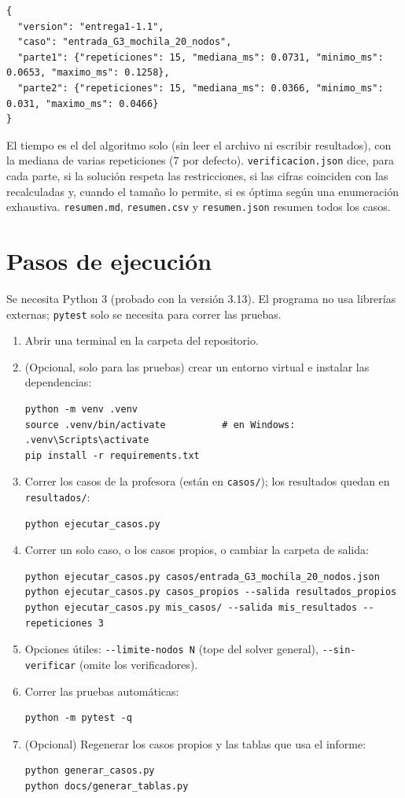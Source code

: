 \documentclass[11pt,a4paper]{article}
\begin{document}
\begin{Verbatim}
{
  "version": "entrega1-1.1",
  "caso": "entrada_G3_mochila_20_nodos",
  "parte1": {"repeticiones": 15, "mediana_ms": 0.0731, "minimo_ms": 0.0653, "maximo_ms": 0.1258},
  "parte2": {"repeticiones": 15, "mediana_ms": 0.0366, "minimo_ms": 0.031, "maximo_ms": 0.0466}
}
\end{Verbatim}

El tiempo es el del algoritmo solo (sin leer el archivo ni escribir resultados), con la mediana de varias repeticiones (7 por defecto). \texttt{verificacion.json} dice, para cada parte, si la solución respeta las restricciones, si las cifras coinciden con las recalculadas y, cuando el tamaño lo permite, si es óptima según una enumeración exhaustiva. \texttt{resumen.md}, \texttt{resumen.csv} y \texttt{resumen.json} resumen todos los casos.

\section{Pasos de ejecución}

Se necesita Python 3 (probado con la versión 3.13). El programa no usa librerías externas; \texttt{pytest} solo se necesita para correr las pruebas.

\begin{enumerate}[nosep]
  \item Abrir una terminal en la carpeta del repositorio.
  \item (Opcional, solo para las pruebas) crear un entorno virtual e instalar las dependencias:
\begin{Verbatim}
python -m venv .venv
source .venv/bin/activate          # en Windows: .venv\Scripts\activate
pip install -r requirements.txt
\end{Verbatim}
  \item Correr los casos de la profesora (están en \texttt{casos/}); los resultados quedan en \texttt{resultados/}:
\begin{Verbatim}
python ejecutar_casos.py
\end{Verbatim}
  \item Correr un solo caso, o los casos propios, o cambiar la carpeta de salida:
\begin{Verbatim}
python ejecutar_casos.py casos/entrada_G3_mochila_20_nodos.json
python ejecutar_casos.py casos_propios --salida resultados_propios
python ejecutar_casos.py mis_casos/ --salida mis_resultados --repeticiones 3
\end{Verbatim}
  \item Opciones útiles: \texttt{-{}-limite-nodos N} (tope del solver general), \texttt{-{}-sin-verificar} (omite los verificadores).
  \item Correr las pruebas automáticas:
\begin{Verbatim}
python -m pytest -q
\end{Verbatim}
  \item (Opcional) Regenerar los casos propios y las tablas que usa el informe:
\begin{Verbatim}
python generar_casos.py
python docs/generar_tablas.py
\end{Verbatim}
\end{enumerate}
\end{document}
